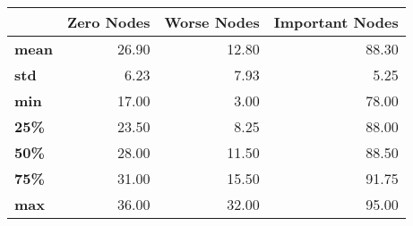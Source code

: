 \begin{tabular}{lrrr}
\toprule
{} &  Zero Nodes &  Worse Nodes &  Important Nodes \\
\midrule
\textbf{mean} &       26.90 &        12.80 &            88.30 \\
\textbf{std } &        6.23 &         7.93 &             5.25 \\
\textbf{min } &       17.00 &         3.00 &            78.00 \\
\textbf{25\% } &       23.50 &         8.25 &            88.00 \\
\textbf{50\% } &       28.00 &        11.50 &            88.50 \\
\textbf{75\% } &       31.00 &        15.50 &            91.75 \\
\textbf{max } &       36.00 &        32.00 &            95.00 \\
\bottomrule
\end{tabular}
